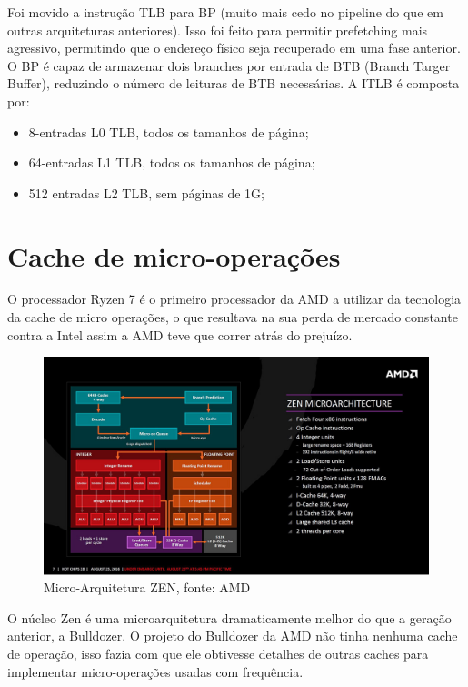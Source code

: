 \documentclass[12pt]{article}
\begin{document}
Foi movido a instrução TLB para BP (muito mais cedo no pipeline do que em outras arquiteturas anteriores). Isso foi feito para permitir prefetching mais agressivo, permitindo que o endereço físico seja recuperado em uma fase anterior. O BP é capaz de armazenar dois branches por entrada de BTB (Branch Targer Buffer), reduzindo o número de leituras de BTB necessárias. A ITLB é composta por:

\begin{itemize}
	\item 8-entradas L0 TLB, todos os tamanhos de página;
	\item 64-entradas L1 TLB, todos os tamanhos de página;
	\item 512 entradas L2 TLB, sem páginas de 1G;
\end{itemize}

\newpage

\section{Cache de micro-operações}

O processador Ryzen 7 é o primeiro processador da AMD a utilizar da tecnologia da cache de micro operações, o que resultava na sua perda de mercado constante contra a Intel assim a AMD teve que correr atrás do prejuízo.

\begin{figure}[H]
\centering
\includegraphics[width=120mm,scale=0.8]{micro-op_cache.jpg}
\caption{Micro-Arquitetura ZEN, fonte: AMD}
\label{fig:AMD CORE}
\end{figure}

O núcleo Zen é uma microarquitetura dramaticamente melhor do que a geração anterior, a Bulldozer. O projeto do Bulldozer da AMD não tinha nenhuma cache de operação, isso fazia com que ele obtivesse detalhes de outras caches para implementar micro-operações usadas com frequência.
\end{document}
